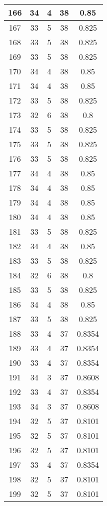 \documentclass[letterpaper, 12pt]{article}
\begin{document}
\begin{longtable}{|c|c|c|c|c|}
\hline
166 & 34 & 4 & 38 & 0.85 \\
\hline
167 & 33 & 5 & 38 & 0.825 \\
\hline
168 & 33 & 5 & 38 & 0.825 \\
\hline
169 & 33 & 5 & 38 & 0.825 \\
\hline
170 & 34 & 4 & 38 & 0.85 \\
\hline
171 & 34 & 4 & 38 & 0.85 \\
\hline
172 & 33 & 5 & 38 & 0.825 \\
\hline
173 & 32 & 6 & 38 & 0.8 \\
\hline
174 & 33 & 5 & 38 & 0.825 \\
\hline
175 & 33 & 5 & 38 & 0.825 \\
\hline
176 & 33 & 5 & 38 & 0.825 \\
\hline
177 & 34 & 4 & 38 & 0.85 \\
\hline
178 & 34 & 4 & 38 & 0.85 \\
\hline
179 & 34 & 4 & 38 & 0.85 \\
\hline
180 & 34 & 4 & 38 & 0.85 \\
\hline
181 & 33 & 5 & 38 & 0.825 \\
\hline
182 & 34 & 4 & 38 & 0.85 \\
\hline
183 & 33 & 5 & 38 & 0.825 \\
\hline
184 & 32 & 6 & 38 & 0.8 \\
\hline
185 & 33 & 5 & 38 & 0.825 \\
\hline
186 & 34 & 4 & 38 & 0.85 \\
\hline
187 & 33 & 5 & 38 & 0.825 \\
\hline
188 & 33 & 4 & 37 & 0.8354 \\
\hline
189 & 33 & 4 & 37 & 0.8354 \\
\hline
190 & 33 & 4 & 37 & 0.8354 \\
\hline
191 & 34 & 3 & 37 & 0.8608 \\
\hline
192 & 33 & 4 & 37 & 0.8354 \\
\hline
193 & 34 & 3 & 37 & 0.8608 \\
\hline
194 & 32 & 5 & 37 & 0.8101 \\
\hline
195 & 32 & 5 & 37 & 0.8101 \\
\hline
196 & 32 & 5 & 37 & 0.8101 \\
\hline
197 & 33 & 4 & 37 & 0.8354 \\
\hline
198 & 32 & 5 & 37 & 0.8101 \\
\hline
199 & 32 & 5 & 37 & 0.8101 \\
\hline
\end{longtable}
\end{document}

